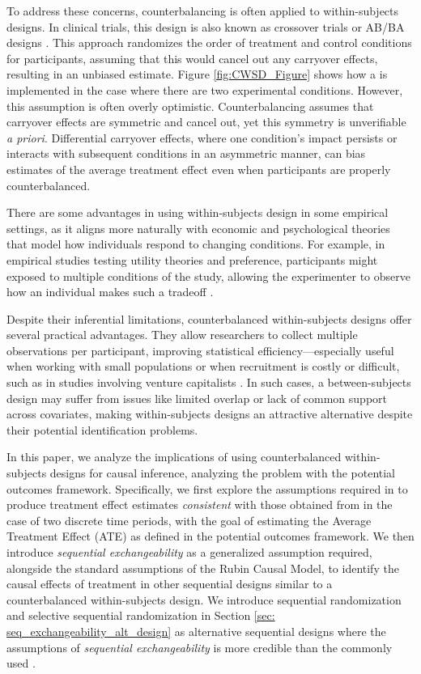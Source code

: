 To address these concerns, counterbalancing is often applied to within-subjects designs. In clinical trials, this design is also known as crossover trials or AB/BA designs \citep{ZHANG2022_crossovertrials, sibbald1998understanding, matthew_multiperiod_crossover}. This approach randomizes the order of treatment and control conditions for participants, assuming that this would cancel out any carryover effects, resulting in an unbiased estimate. Figure \ref{fig:CWSD_Figure} shows how a \cwsd{} is implemented in the case where there are two experimental conditions. However, this assumption is often overly optimistic. Counterbalancing assumes that carryover effects are symmetric and cancel out, yet this symmetry is unverifiable \emph{a priori}. Differential carryover effects, where one condition's impact persists or interacts with subsequent conditions in an asymmetric manner, can bias estimates of the average treatment effect even when participants are properly counterbalanced.

There are some advantages in using within-subjects design in some empirical settings, as it aligns more naturally with economic and psychological theories that model how individuals respond to changing conditions. For example, in empirical studies testing utility theories and preference, participants might exposed to multiple conditions of the study, allowing the experimenter to observe how an individual makes such a tradeoff \citep{09_Charness}. 

Despite their inferential limitations, counterbalanced within-subjects designs offer several practical advantages. They allow researchers to collect multiple observations per participant, improving statistical efficiency—especially useful when working with small populations or when recruitment is costly or difficult, such as in studies involving venture capitalists \citep{Lane2024}. In such cases, a between-subjects design may suffer from issues like limited overlap or lack of common support across covariates, making within-subjects designs an attractive alternative despite their potential identification problems.

In this paper, we analyze the implications of using counterbalanced within-subjects designs for causal inference, analyzing the problem with the potential outcomes framework. Specifically, we first explore the assumptions required in \cwsd{} to produce treatment effect estimates \emph{consistent} with those obtained from \bsd{} in the case of two discrete time periods, with the goal of estimating the Average Treatment Effect (ATE) as defined in the potential outcomes framework. We then introduce \textit{sequential exchangeability} as a generalized assumption required, alongside the standard assumptions of the Rubin Causal Model, to identify the causal effects of treatment in other sequential designs similar to a counterbalanced within-subjects design. We introduce sequential randomization and selective sequential randomization in Section \ref{sec: seq_exchangeability_alt_design} as alternative sequential designs where the assumptions of \textit{sequential exchangeability} is more credible than the commonly used \cwsd{}.

